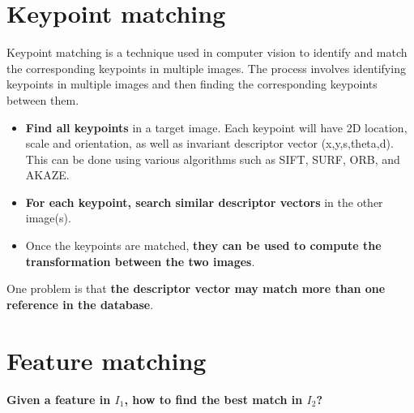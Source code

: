 \documentclass{article}
\begin{document}
\newpage

\section*{Keypoint matching}

Keypoint matching is a technique used in computer vision to identify and match the corresponding keypoints in multiple images. The process involves identifying keypoints in multiple images and then finding the corresponding keypoints between them. 

\begin{itemize}
    \item \textbf{Find all keypoints} in a target image. Each keypoint will have 2D location, scale and orientation, as well as invariant descriptor vector (x,y,s,theta,d). This can be done using various algorithms such as SIFT, SURF, ORB, and AKAZE.
    \item \textbf{For each keypoint, search similar descriptor vectors} in the other image(s).
    \item Once the keypoints are matched, \textbf{they can be used to compute the transformation between the two images}. 
\end{itemize}

One problem is that \textbf{the descriptor vector may match more than one reference in the database}.

\section*{Feature matching}

\textbf{Given a feature in $I_1$, how to find the best match in $I_2$?}
\end{document}
